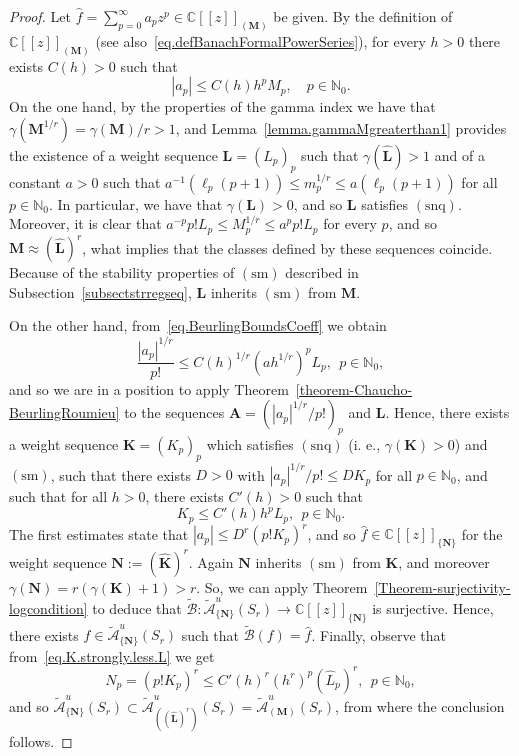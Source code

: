 \documentclass[11pt,a4paper]{article}
\theoremstyle{plain}
\theoremstyle{definition}
\numberwithin{equation}{section}
\newcommand{\N}{\mathbb{N}}
\newcommand{\C}{\mathbb{C}}
\newcommand{\M}{{\boldsymbol{M}}}
\newcommand{\NN}{{\boldsymbol{N}}}
\newcommand{\LL}{{\boldsymbol{L}}}
\def\ga{\gamma}
\newcommand{\snq}{\operatorname{(snq)}}
\newcommand{\sm}{\operatorname{(sm)}}
\begin{document}
\begin{proof}
Let $\widehat{f}=\sum_{p=0}^\infty a_pz^p\in\C[[z]]_{(\M)}$ be given. By the definition of $\C[[z]]_{(\M)}$ (see also~\eqref{eq.defBanachFormalPowerSeries}), for every $h>0$ there exists $C(h)>0$ such that
	\begin{equation}\label{eq.BeurlingBoundsCoeff}
		|a_p|\le C(h)h^{p}M_{p},\quad p\in\N_0.
	\end{equation}
On the one hand, by the properties of the gamma index we have that $\gamma(\M^{1/r})=\ga(\M)/r>1$, and Lemma~\ref{lemma.gammaMgreaterthan1} provides the existence of a weight sequence $\LL=(L_p)_p$ such that
$\gamma(\widehat{\LL})>1$ and of a constant $a>0$ such that $a^{-1}(\ell_p(p+1))\leq m_p^{1/r}\leq a(\ell_p(p+1))$ for all $p\in\N_0$.
In particular, we have that $\gamma(\LL)>0$, and so $\LL$ satisfies $\snq$. Moreover, it is clear that $a^{-p}p!L_p\le M_p^{1/r}\le a^pp!L_p$ for every $p$, and so $\M\approx (\widehat{\LL})^r$, what implies that the classes defined by these sequences coincide. Because of the stability properties of $\sm$ described in Subsection~\ref{subsectstrregseq}, $\LL$ inherits $\sm$ from $\M$.

On the other hand, from~\eqref{eq.BeurlingBoundsCoeff} we obtain
$$
\frac{|a_p|^{1/r}}{p!}\le C(h)^{1/r}(ah^{1/r})^{p}L_{p},\ \ p\in\N_0,
$$
and so we are in a position to apply Theorem~\ref{theorem-Chaucho-BeurlingRoumieu} to the sequences $\boldsymbol{A}=(|a_p|^{1/r}/p!)_p$ and $\LL$. Hence, there exists a weight sequence $\boldsymbol{K}=(K_p)_p$ which satisfies $\snq$ (i. e., $\ga(\boldsymbol{K})>0$) and $\sm$, such that there exists $D>0$ with $|a_p|^{1/r}/p! \leq D K_p$ for all $p\in\N_0$, and such that for all $h>0$, there exists $C'(h)>0$ such that
\begin{equation}\label{eq.K.strongly.less.L}
K_p\leq C'(h) h^p L_p,\ \  p\in\N_0.
\end{equation}
The first estimates state that $|a_p|\le D^r(p!K_p)^r$, and so $\widehat{f}\in\C[[z]]_{\{\NN\}}$ for the weight sequence $\NN:=(\widehat{\boldsymbol{K}})^r$. Again $\NN$ inherits $\sm$ from $\boldsymbol{K}$, and moreover
$\ga(\NN)=r(\ga(\boldsymbol{K})+1)>r$. So,
we can apply Theorem~\ref{Theorem-surjectivity-logcondition} to deduce that $\widetilde{\mathcal{B}}\colon \widetilde{\mathcal{A}}^u_{\{\NN\}}(S_{r})\to\C[[z]]_{\{\NN\}}$ is surjective. Hence, there exists $f\in\widetilde{\mathcal{A}}^u_{\{\NN\}}(S_{r})$ such that $\widetilde{\mathcal{B}}(f)=\widehat{f}$. Finally, observe that from~\eqref{eq.K.strongly.less.L} we get
$$
N_p=(p!K_p)^r\le C'(h)^r(h^r)^p(\widehat{L}_p)^r,\ \ p\in\N_0,
$$
and so $\widetilde{\mathcal{A}}^u_{\{\NN\}}(S_{r})\subset
\widetilde{\mathcal{A}}^u_{((\widehat{\LL})^r)}(S_{r})= \widetilde{\mathcal{A}}^u_{(\M)}(S_{r})$, from where the conclusion follows.
\end{proof}
\end{document}
